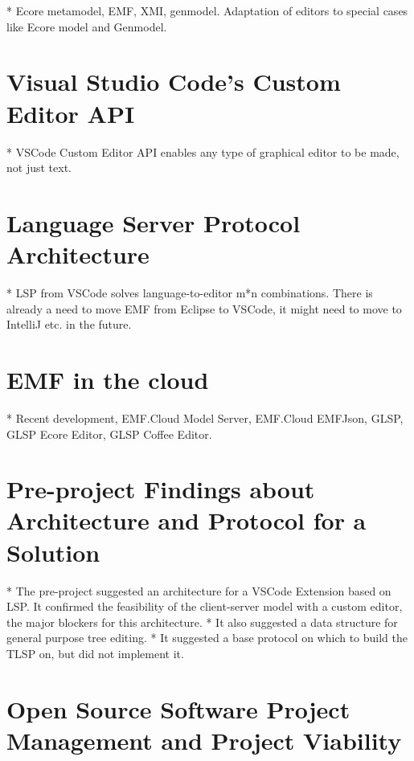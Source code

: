 * Ecore metamodel, EMF, XMI, genmodel. Adaptation of editors to special cases like Ecore model and Genmodel.

\section{Visual Studio Code's Custom Editor API}

* VSCode Custom Editor API enables any type of graphical editor to be made, not just text.

\section{Language Server Protocol Architecture}

* LSP from VSCode solves language-to-editor m*n combinations. There is already a need to move EMF from Eclipse to VSCode, it might need to move to IntelliJ etc. in the future.

\section{\acrlong{EMF} in the \Gls{cloud}}

* Recent development, EMF.Cloud Model Server, EMF.Cloud EMFJson, GLSP, GLSP Ecore Editor, GLSP Coffee Editor.

\section{Pre-project Findings about Architecture and Protocol for a Solution}

* The pre-project suggested an architecture for a VSCode Extension based on LSP. It confirmed the feasibility of the client-server model with a custom editor, the major blockers for this architecture.
  * It also suggested a data structure for general purpose tree editing.
  * It suggested a base protocol on which to build the TLSP on, but did not implement it.

\section{Open Source Software Project Management and Project Viability}

